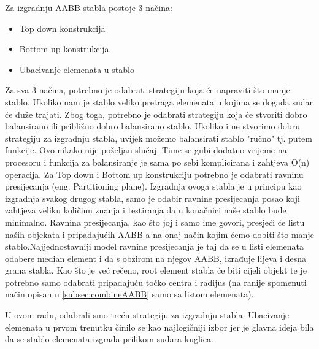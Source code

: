 Za izgradnju AABB stabla postoje 3 načina\cite{3}: 
\begin{itemize}
	\item Top down konstrukcija
	\item Bottom up konstrukcija
	\item Ubacivanje elemenata u stablo
\end{itemize}
Za sva 3 načina, potrebno je odabrati strategiju koja će napraviti što manje stablo. Ukoliko nam je stablo veliko pretraga elemenata u kojima se događa sudar će duže trajati. Zbog toga, potrebno je odabrati strategiju koja će stvoriti dobro balansirano ili približno dobro balansirano stablo\cite{1}. Ukoliko i ne stvorimo dobru strategiju za izgradnju stabla, uvijek možemo balansirati stablo "ručno" tj. putem funkcije. Ovo nikako nije poželjan slučaj. Time se gubi dodatno vrijeme na procesoru i funkcija za balansiranje je sama po sebi komplicirana i zahtjeva O(n) operacija. Za Top down i Bottom up konstrukciju potrebno je odabrati ravninu presijecanja (eng. Partitioning plane). Izgradnja ovoga stabla je u principu kao izgradnja svakog drugog stabla, samo je odabir ravnine presijecanja posao koji zahtjeva veliku količinu znanja i testiranja da u konačnici naše stablo bude minimalno. 
Ravnina presijecanja, kao što joj i samo ime govori, presjeći će listu naših objekata i pripadajućih AABB-a na onaj način kojim ćemo dobiti što manje stablo.Najjednostavniji model ravnine presijecanja je taj da se u listi elemenata odabere median element i da s obzirom na njegov AABB, izrađuje lijeva i desna grana stabla. Kao što je već rečeno, root element stabla će biti cijeli objekt te je potrebno samo odabrati pripadajuću točko centra i radijus (na ranije spomenuti način opisan u \ref{subsec:combineAABB} samo sa listom elemenata).

U ovom radu, odabrali smo treću strategiju za izgradnju stabla. Ubacivanje elemenata u prvom trenutku činilo se kao najlogičniji izbor jer je glavna ideja bila da se stablo elemenata izgrada prilikom sudara kuglica.

